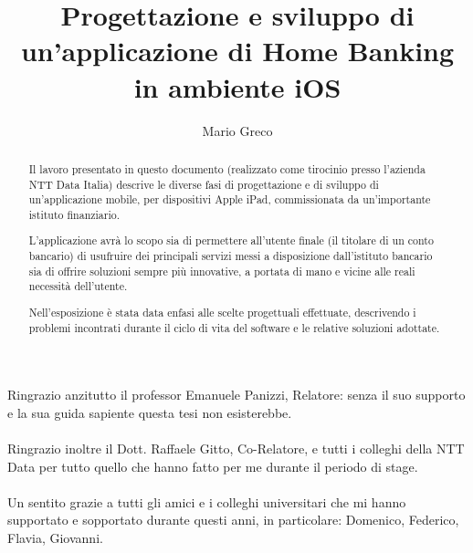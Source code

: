 \documentclass[LaM,binding=0.6cm]{sapthesis}
\title{Progettazione e sviluppo di un'applicazione di Home Banking in ambiente iOS}
\author{Mario Greco}
\begin{document}
\onehalfspace 
\frontmatter

\maketitle

\dedication{Dedicato a chi non ha mai mollato}

\begin{abstract}
Il lavoro presentato in questo documento (realizzato come tirocinio presso l'azienda NTT Data Italia) descrive le diverse fasi di progettazione e di sviluppo di un'applicazione mobile, per dispositivi Apple iPad,  commissionata da un'importante istituto finanziario.

L'applicazione avrà lo scopo sia di permettere all'utente finale (il titolare di un conto bancario) di usufruire dei principali servizi messi a disposizione dall'istituto bancario sia di offrire soluzioni sempre più innovative, a portata di mano e vicine alle reali necessità dell'utente.

% 

Nell'esposizione è stata data enfasi alle scelte progettuali effettuate, descrivendo i problemi incontrati durante il ciclo di vita del software e le relative soluzioni adottate.

\end{abstract}

\begin{acknowledgments}
Ringrazio anzitutto il  professor Emanuele Panizzi, Relatore: senza il suo supporto e la sua guida sapiente questa tesi non esisterebbe. 
\\\\
Ringrazio inoltre il Dott. Raffaele Gitto, Co-Relatore, e tutti i colleghi della NTT Data per tutto quello che hanno fatto per me durante il periodo di stage.
\\\\
Un sentito grazie a tutti gli amici e i colleghi universitari che mi hanno supportato e sopportato durante questi anni, in particolare: Domenico, Federico, Flavia, Giovanni. 
\end{acknowledgments}
\end{document}
